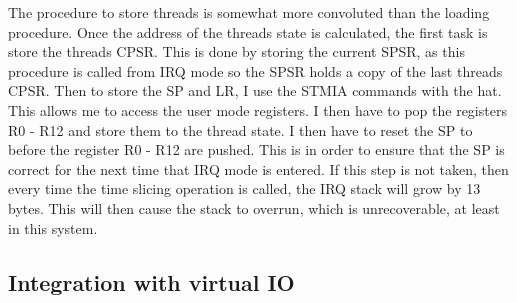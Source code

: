 The procedure to store threads is somewhat more convoluted than the loading procedure. Once the address of the threads state is calculated, the first task is store the threads CPSR. This is done by storing the current SPSR, as this procedure is called from IRQ mode so the SPSR holds a copy of the last threads CPSR. Then to store the SP and LR, I use the STMIA commands with the hat. This allows me to access the user mode registers. I then have to pop the registers R0 - R12 and store them to the thread state. I then have to reset the SP to before the register R0 - R12 are pushed. This is in order to ensure that the SP is correct for the next time that IRQ mode is entered. If this step is not taken, then every time the time slicing operation is called, the IRQ stack will grow by 13 bytes. This will then cause the stack to overrun, which is unrecoverable, at least in this system.


\subsection{Integration with virtual IO}
























